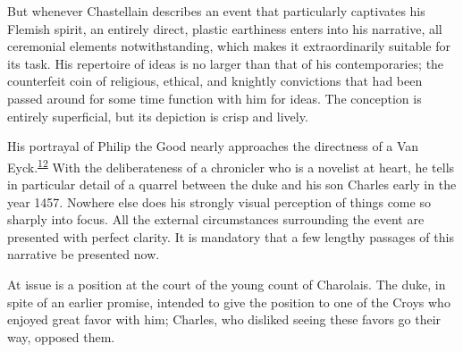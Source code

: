 \protect\hypertarget{21_Chapter_Thirteen__IMAGE_AND_WORD.xhtmlux5cux23page_343}{}{}But
whenever Chastellain describes an event that particularly captivates his
Flemish spirit, an entirely direct, plastic earthiness enters into his
narrative, all ceremonial elements notwithstanding, which makes it
extraordinarily suitable for its task. His repertoire of ideas is no
larger than that of his contemporaries; the counterfeit coin of
religious, ethical, and knightly convictions that had been passed around
for some time function with him for ideas. The conception is entirely
superficial, but its depiction is crisp and lively.

His portrayal of Philip the Good nearly approaches the directness of a
Van
Eyck.\textsuperscript{\protect\hypertarget{21_Chapter_Thirteen__IMAGE_AND_WORD.xhtmlux5cux23id_285}{\protect\hyperlink{23_NOTES.xhtmlux5cux23id_286}{12}}}
With the deliberateness of a chronicler who is a novelist at heart, he
tells in particular detail of a quarrel between the duke and his son
Charles early in the year 1457. Nowhere else does his strongly visual
perception of things come so sharply into focus. All the external
circumstances surrounding the event are presented with perfect clarity.
It is mandatory that a few lengthy passages of this narrative be
presented now.

At issue is a position at the court of the young count of Charolais. The
duke, in spite of an earlier promise, intended to give the position to
one of the Croys who enjoyed great favor with him; Charles, who disliked
seeing these favors go their way, opposed them.

